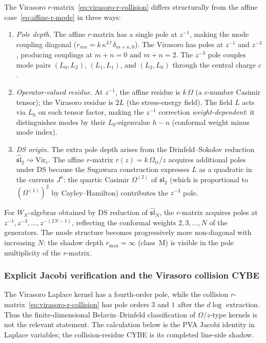 \begin{remark}
\label{rem:virasoro-r-nondiagonal}
The Virasoro $r$-matrix~\eqref{eq:virasoro-r-collision}
differs structurally from the affine
case~\eqref{eq:affine-r-mode} in three ways:
\begin{enumerate}[label=\textup{(\roman*)}]
\item \emph{Pole depth.}
 The affine $r$-matrix has a single pole at $z^{-1}$,
 making the mode coupling diagonal
 ($r_{mn} = k\,\kappa^{IJ}\,\delta_{m+n,0}$).
 The Virasoro has poles at $z^{-1}$ and $z^{-3}$,
 producing couplings at $m + n = 0$ and $m + n = 2$.
 The $z^{-3}$ pole couples mode pairs
 $(L_0, L_2)$, $(L_1, L_1)$, and $(L_2, L_0)$
 through the central charge $c$.
\item \emph{Operator-valued residue.}
 At $z^{-1}$, the affine residue is $k\,\Omega$
 (a c-number Casimir tensor); the Virasoro residue is
 $2L$ (the stress-energy field). The field $L$ acts
 via $L_0$ on each tensor factor, making the $z^{-1}$
 correction \emph{weight-dependent}: it distinguishes modes
 by their $L_0$-eigenvalue $h - n$ (conformal weight
 minus mode index).
\item \emph{DS origin.}
 The extra pole depth arises from the Drinfeld--Sokolov
 reduction $\widehat{\mathfrak{sl}}_2 \rightsquigarrow
 \mathrm{Vir}_c$. The affine $r$-matrix
 $r(z) = k\,\Omega_{\mathrm{tr}}/z$ acquires additional poles under DS
 because the Sugawara construction expresses $L$ as a
 quadratic in the currents $J^a$: the quartic Casimir
 $\Omega^{(2)}$ of $\mathfrak{sl}_2$ (which is
 proportional to $(\Omega^{(1)})^2$ by Cayley--Hamilton)
 contributes the $z^{-3}$ pole.
\end{enumerate}
For $W_N$-algebras obtained by DS reduction of
$\widehat{\mathfrak{sl}}_N$, the $r$-matrix acquires poles
at $z^{-1}, z^{-3}, \ldots, z^{-(2N-1)}$, reflecting the
conformal weights $2, 3, \ldots, N$ of the generators.
The mode structure becomes progressively more non-diagonal
with increasing $N$: the shadow depth
$r_{\max} = \infty$ (class~M) is visible in the
pole multiplicity of the $r$-matrix.
\end{remark}

\subsubsection{Explicit Jacobi verification and the Virasoro collision CYBE}
\label{subsubsec:virasoro-cybe-verification}

The Virasoro Laplace kernel has a fourth-order pole, while the
collision \(r\)-matrix~\eqref{eq:virasoro-r-collision} has pole
orders \(3\) and \(1\) after the \(d\log\) extraction.  Thus the
finite-dimensional Belavin--Drinfeld classification of
\(\Omega/z\)-type kernels is not the relevant statement.  The
calculation below is the PVA Jacobi identity in Laplace variables; the
collision-residue CYBE is its completed line-side shadow.

